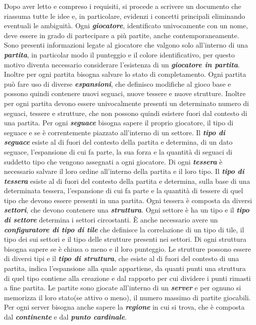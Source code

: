     Dopo aver letto e compreso i requisiti, si procede a scrivere un documento che riassuma tutte le idee e, in particolare, evidenzi i concetti principali eliminando eventuali le ambiguità.
    Ogni \textbf{\emph{giocatore}}, identificato univocamente con un nome, deve essere in grado di partecipare a più partite, anche contemporaneamente. Sono presenti informazioni legate al giocatore che valgono solo all'interno di una \textbf{\emph{partita}}, in particolar modo il punteggio e il colore identificativo, per questo motivo diventa necessario considerare l'esistenza di un \textbf{\emph{giocatore in partita}}. Inoltre per ogni partita bisogna salvare lo stato di completamento. Ogni partita può fare uso di diverse \textbf{\emph{espansioni}}, che definisco modifiche al gioco base e possono quindi contenere nuovi seguaci, nuove tessere e nuove strutture. Inoltre per ogni partita devono essere univocalmente presenti un determinato numero di seguaci, tessere e strutture, che non possono quindi esistere fuori dal contesto di una partita. Per ogni \textbf{\emph{seguace}} bisogna sapere il proprio giocatore, il tipo di seguace e se è correntemente piazzato all'interno di un settore. Il \textbf{\emph{tipo di seguace}} esiste al di fuori del contesto della partita e determina, di un dato seguace, l'espansione di cui fa parte, la sua forza e la quantità di seguaci di suddetto tipo che vengono assegnati a ogni giocatore. Di ogni \textbf{\emph{tessera}} è necessario salvare il loro ordine all'interno della partita e il loro tipo. Il \textbf{\emph{tipo di tessera}} esiste al di fuori del contesto della partita e determina, sulla base di una determinata tessera, l'espansione di cui fa parte e la quantità di tessere di quel tipo che devono essere presenti in una partita. Ogni tessera è composta da diversi \textbf{\emph{settori}}, che devono contenere una \textbf{\emph{struttura}}. Ogni settore è ha un tipo e il \textbf{\emph{tipo di settore}} determina i settori circostanti. È anche necessario avere un \textbf{\emph{configuratore di tipo di tile}} che definisce la correlazione di un tipo di tile, il tipo dei sui settori e il tipo delle strutture presenti nei settori. Di ogni struttura bisogna sapere se è chiusa o meno e il loro punteggio. Le strutture possono essere di diversi tipi e il \textbf{\emph{tipo di struttura}}, che esiste al di fuori del contesto di una partita, indica l'espansione alla quale appartiene, da quanti punti una struttura di quel tipo contiene alla creazione e dal rapporto per cui dividere i punti rimasti a fine partita. Le partite sono giocate all'interno di un \textbf{\emph{server}} e per ognuno si memorizza il loro stato(se attivo o meno), il numero massimo di partite giocabili. Per ogni server bisogna anche sapere la \textbf{\emph{regione}} in cui si trova, che è composta dal \textbf{\emph{continente}} e dal \textbf{\emph{punto cardinale}}.

